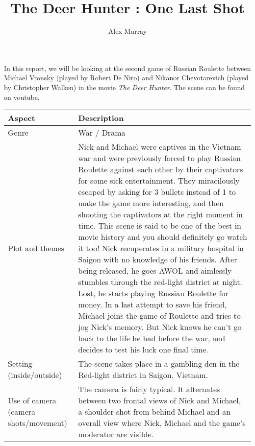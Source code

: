 \documentclass[notitlepage]{fhnwreport}
\title{The Deer Hunter : One Last Shot}
\author{Alex Murray}
\begin{document}
\maketitle

In this report,  we  will  be  looking  at the second game of Russian Roulette
between Michael  Vronsky  (played by Robert De Niro) and Nikanor Chevotarevich
(played by Christopher Walken) in the  movie  \textit{The  Deer  Hunter}.  The
scene can be found on youtube\cite{ref:scene}.

\begin{center}
\begin{threeparttable}
	\begin{tabular}{p{4.2cm}p{11cm}}
		\toprule
        \textbf{Aspect} & \textbf{Description} \\

		\midrule
		Genre & 

War / Drama \\

		\midrule
		Plot and themes &

Nick and Michael were captives in the Vietnam war and were  previously  forced
to play Russian Roulette against each other by their captivators for some sick
entertainment.  They miracilously escaped by asking for 3 bullets instead of 1
to  make the game more interesting, and then shooting the captivators  at  the
right  moment  in  time.  This  scene is said to be one of the best  in  movie
history and you should definitely  go  watch  it  too!  Nick  recuperates in a
military  hospital  in  Saigon  with no knowledge of his friends. After  being
released, he goes AWOL and aimlessly  stumbles  through the red-light district
at night. Lost,  he  starts  playing  Russian  Roulette  for  money. In a last
attempt to save his friend,  Michael  joins  the game of Roulette and tries to
jog Nick's memory. But Nick knows he can't go back to the life he  had  before
the war, and decides to test his luck one final time. \\

		\midrule
		Setting (inside/outside) &

The scene takes place in a gambling den in the Red-light district  in  Saigon,
Vietnam. \\

		\midrule
        Use of camera (camera shots/movement)  &

The camera is fairly typical. It alternates between two  frontal views of Nick
and Michael, a  shoulder-shot  from  behind  Michael and an overall view where
Nick, Michael and the game's moderator are visible. \\


\end{tabular}
\end{threeparttable}
\end{center}
\end{document}
